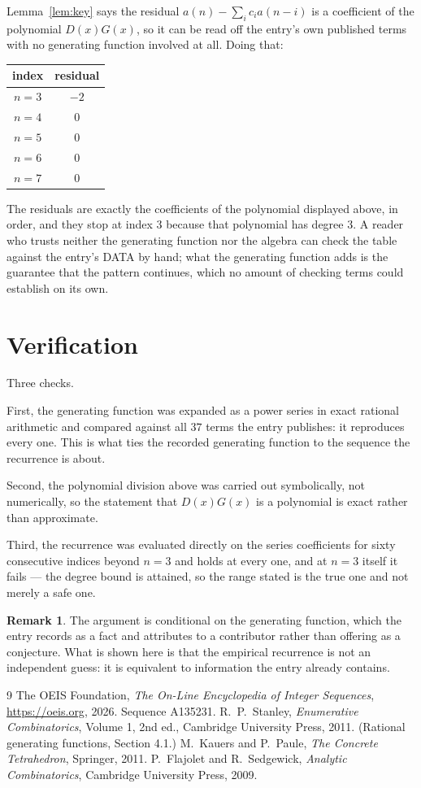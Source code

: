 \documentclass[11pt,a4paper]{article}
\theoremstyle{plain}
\theoremstyle{definition}
\newtheorem{remark}[theorem]{Remark}
\begin{document}
Lemma~\ref{lem:key} says the residual $a(n)-\sum_ic_ia(n-i)$ is a coefficient of the
polynomial $D(x)G(x)$, so it can be read off the entry's own published terms with no
generating function involved at all. Doing that:
\begin{center}
\begin{tabular}{cc}
index & residual \\ \hline
$n=3$ & $-2$ \\
$n=4$ & $0$ \\
$n=5$ & $0$ \\
$n=6$ & $0$ \\
$n=7$ & $0$
\end{tabular}
\end{center}
The residuals are exactly the coefficients of the polynomial displayed above, in order, and
they stop at index $3$ because that polynomial has degree $3$. A reader who trusts
neither the generating function nor the algebra can check the table against the entry's DATA
by hand; what the generating function adds is the guarantee that the pattern continues, which
no amount of checking terms could establish on its own.

\section{Verification}

Three checks.

First, the generating function was expanded as a power series in exact rational arithmetic and
compared against all $37$ terms the entry publishes: it reproduces every one. This is
what ties the recorded generating function to the sequence the recurrence is about.

Second, the polynomial division above was carried out symbolically, not numerically, so the
statement that $D(x)G(x)$ is a polynomial is exact rather than approximate.

Third, the recurrence was evaluated directly on the series coefficients for sixty consecutive
indices beyond $n=3$ and holds at every one, and at $n=3$ itself it fails --- the
degree bound is attained, so the range stated is the true one and not merely a safe one.

\begin{remark}
The argument is conditional on the generating function, which the entry records as a fact and
attributes to a contributor rather than offering as a conjecture. What is shown here is that
the empirical recurrence is not an independent guess: it is equivalent to information the
entry already contains.
\end{remark}

\begin{thebibliography}{9}
 The OEIS Foundation, \emph{The On-Line Encyclopedia of Integer
Sequences}, \url{https://oeis.org}, 2026. Sequence A135231.
 R.~P.~Stanley, \emph{Enumerative Combinatorics}, Volume 1, 2nd ed.,
Cambridge University Press, 2011. (Rational generating functions, Section 4.1.)
 M.~Kauers and P.~Paule, \emph{The Concrete Tetrahedron}, Springer, 2011.
 P.~Flajolet and R.~Sedgewick, \emph{Analytic Combinatorics}, Cambridge
University Press, 2009.
\end{thebibliography}
\end{document}
